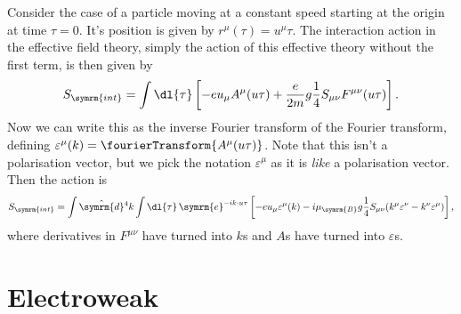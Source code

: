 \documentclass[fleqn]{NotesClass}
\newcommand{\e}{\symrm{e}}
\newcommand{\interaction}{{\symrm{int}}}
\newcommand{\dhat}[1]{\hat{\symrm{d}}{#1}}
\newcommand{\bohrMagneton}{\mu_{\symrm{B}}}
\begin{document}
    Consider the case of a particle moving at a constant speed starting at the origin at time \(\tau = 0\).
    It's position is given by \(r^\mu(\tau) = u^\mu \tau\).
    The interaction action in the effective field theory, simply the action of this effective theory without the first term, is then given by
    \begin{equation}
        S_{\interaction} = \int \dl{\tau} \left[ -e u_\mu A^\mu(u\tau) + \frac{e}{2m}g \frac{1}{4}S_{\mu\nu}F^{\mu\nu}(u\tau) \right].
    \end{equation}
    Now we can write this as the inverse Fourier transform of the Fourier transform, defining \(\varepsilon^\mu(k) = \fourierTransform\{A^\mu(u\tau)\}\).
    Note that this isn't a polarisation vector, but we pick the notation \(\varepsilon^\mu\) as it is \emph{like} a polarisation vector.
    Then the action is
    \begin{equation}
        S_{\interaction} = \int \dhat{^4k} \int \dl{\tau} \, \e^{-ik \cdot u\tau}\left[ -eu_\mu \varepsilon^\mu(k) - i\bohrMagneton g \frac{1}{4}S_{\mu\nu}(k^\mu \varepsilon^\nu - k^\nu \varepsilon^\mu) \right],
    \end{equation}
    where derivatives in \(F^{\mu\nu}\) have turned into \(k\)s and \(A\)s have turned into \(\varepsilon\)s.
    
    
    
    
    
    
    
    
    
    
    
    
    
    
    
    
    
    
    
    
    
    
    \part{Electroweak}
\end{document}
